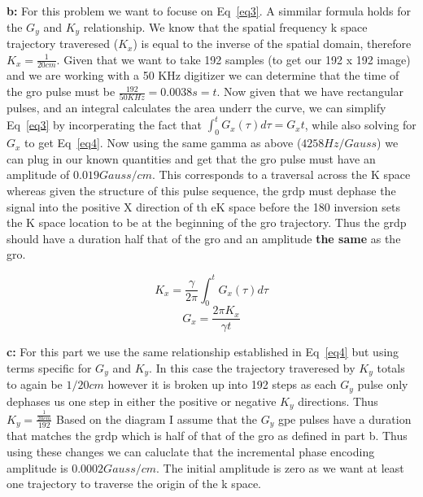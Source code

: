 \documentclass[12pt]{article}
\begin{document}
\noindent\textbf{b: }
For this problem we want to focuse on Eq~\ref{eq3}. A simmilar formula holds for the $G_y$ and $K_y$ relationship. We know that the spatial frequency k space trajectory traveresed ($K_x$) is equal to the inverse of the spatial domain, therefore $K_x = \frac{1}{20cm}$. Given that we want to take 192 samples (to get our 192 x 192 image) and we are working with a 50 KHz digitizer we can determine that the time of the gro pulse must be $\frac{192}{50KHz} = 0.0038 s = t$. Now given that we have rectangular pulses, and an integral calculates the area underr the curve, we can simplify Eq~\ref{eq3} by incorperating the fact that $\int_{0}^{t}G_x(\tau)d\tau = G_xt$, while also solving for $G_x$ to get Eq~\ref{eq4}. Now using the same gamma as above ($4258 Hz/Gauss$) we can plug in our known quantities and get that the gro pulse must have an amplitude of $0.019 Gauss/cm$. This corresponds to a traversal across the K space whereas given the structure of this pulse sequence, the grdp must dephase the signal into the positive X direction of th eK space before the 180 inversion sets the K space location to be at the beginning of the gro trajectory. Thus the grdp should have a duration half that of the gro and an amplitude \textbf{the same} as the gro. 

\begin{equation}
K_x = \frac{\gamma}{2\pi} \int_{0}^{t}G_x(\tau)d\tau
\label{eq3}
\end{equation}
\begin{equation}
G_x = \frac{2\pi K_x}{\gamma t}
\label{eq4}
\end{equation}

\noindent\textbf{c: }
For this part we use the same relationship established in Eq~\ref{eq4} but using terms specific for $G_y$ and $K_y$. In this case the trajectory traveresed by $K_y$ totals to again be $1/20cm$ however it is broken up into 192 steps as each $G_y$ pulse only dephases us one step in either the positive or negative $K_y$ directions. Thus $K_y = \frac{\frac{1}{20 cm}}{192}$ Based on the diagram I assume that the $G_y$ gpe pulses have a duration that matches the grdp which is half of that of the gro as defined in part b. Thus using these changes we can caluclate that the incremental phase encoding amplitude is $0.0002 Gauss/cm$. The initial amplitude is zero as we want at least one trajectory to traverse the origin of the k space.
	
\end{document}
